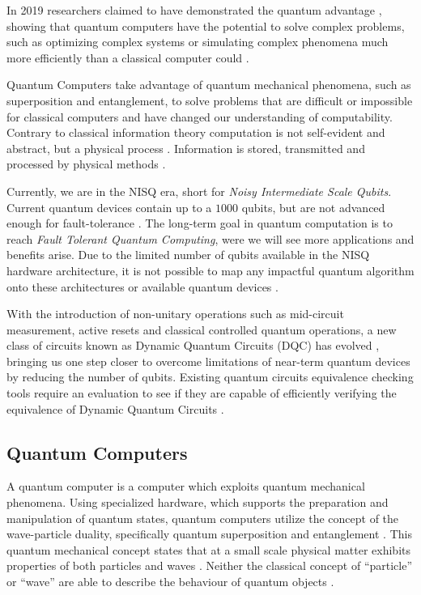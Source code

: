 \documentclass[11pt]{article}
\theoremstyle{definition}
\theoremstyle{definition}
\begin{document}
In 2019 researchers claimed to have demonstrated the quantum advantage
\cite{arute_quantum_2019},
showing that quantum computers have the potential to solve complex problems,
such as optimizing complex systems or simulating complex phenomena
much more efficiently than a classical computer could \cite{preskill_quantum_2018}.

Quantum Computers take advantage of quantum mechanical phenomena, such
as superposition and entanglement, to solve problems that are difficult or
impossible for classical computers \cite{hayashi_introduction_2015}
and have changed our understanding of computability.
Contrary to classical information theory computation is not
self-evident and abstract, but a physical process
\cite{sep-computation-physicalsystems_2021}.
Information is stored, transmitted and processed by physical methods \cite{deutsch_quantum_1985}.


Currently, we are in the NISQ era, short for \emph{Noisy Intermediate Scale Qubits}.
Current quantum devices contain up to a \(1000\) qubits, but are not advanced enough
for fault-tolerance \cite{preskill_quantum_2018}.
The long-term goal in quantum computation is to reach \emph{Fault Tolerant Quantum Computing},
were we will see more applications and benefits arise.
Due to the limited number of qubits available in the NISQ hardware
architecture, it is not possible to map any impactful quantum algorithm onto
these architectures or available quantum devices \cite{almudever_realizing_2020}.

With the introduction of non-unitary operations such as mid-circuit
measurement, active resets and classical controlled quantum operations,
a new class of circuits known as Dynamic
Quantum Circuits (DQC) has evolved \cite{corcoles_exploiting_2021}, bringing
us one step closer to overcome limitations of near-term quantum devices by
reducing the number of qubits.
Existing quantum circuits equivalence checking tools require an
evaluation to see if they are capable of efficiently verifying the equivalence of
Dynamic Quantum Circuits \cite{burgholzerHandlingNonunitariesQuantum2022}.
\subsection{Quantum Computers}
\label{sec:org4de1618}
A quantum computer is a computer which exploits quantum mechanical phenomena.
Using specialized hardware, which supports the preparation and manipulation
of quantum states, quantum computers utilize the concept of the
wave-particle duality, specifically quantum superposition and entanglement \cite{nielsen_quantum_2010}.
This quantum mechanical concept states that at a small scale physical matter
exhibits properties of both particles and waves \cite{messiah_quantum_1999}. Neither the classical concept
of ``particle'' or ``wave'' are able to describe the behaviour of quantum objects \cite{feynman_quantum_2007}.
\end{document}
